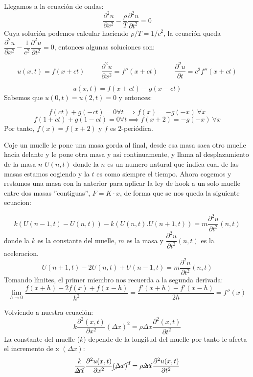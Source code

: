 \documentclass[openany]{book}
\begin{document}
Llegamos a la ecuación de ondas:
$$ \dfrac{\partial ^2 u}{\partial x ^2}- \dfrac{\rho}{T} \dfrac{\partial ^2 u}{\partial t ^2} = 0 $$
Cuya solución podemos calcular haciendo $ \rho/T = 1/c ^2 $, la ecuación queda $ \dfrac{\partial ^2 u}{\partial x ^2}-  \dfrac{1}{c ^2} \dfrac{\partial ^2 u}{\partial t ^2} = 0 $, entonces algunas soluciones son:

$$ u(x,t) = f(x+ct)\hspace{1cm}\dfrac{\partial ^2 u}{\partial x ^2} = f''(x+ct)\hspace{1cm} \dfrac{\partial ^2 u}{\partial t} = c ^2 f''(x+ct)  $$

$$ u(x,t) = f(x+ct)-g(x-ct) $$
Sabemos que $ u(0,t)=u(2,t)=0 $ y entonces:

$$ f(ct) +g(-ct) = 0 \forall t \implies f(x) = -g(-x) \ \forall x$$
$$ f(1+ct) +g(1-ct) = 0 \forall t \implies f(x+2)=-g(-x)\ \forall x $$
Por tanto, $ f(x) = f(x+2) $ y $ f $ es 2-periódica.


Coje un muelle le pone una masa gorda al final, desde esa masa saca otro muelle hacia delante y le pone otra masa y asi continuamente, y llama al desplazamiento de la masa $n$  $U(n,t)$ donde la $n$ es un numero natural que indica cual de las masas estamos cogiendo y la $t$ es como siempre el tiempo. Ahora cogemos y restamos una masa con la anterior para aplicar la ley de hook a un solo muelle entre dos masas ''contiguas'', $F=K \cdot x$, de forma que se nos queda la siguiente ecuacion:


$$ k(U(n-1,t)-U(n,t))-k(U(n,t).U(n+1,t)) = m \dfrac{\partial ^2 u}{\partial t ^2}(n,t)  $$
donde la $k$ es la constante del muelle, $m$ es la masa y $\dfrac{\partial ^2 u}{\partial t ^2}(n,t)$ es la aceleracion.
$$ U(n+1,t)-2U(n,t)+U(n-1,t) = m \dfrac{\partial ^2 u}{\partial t ^2}(n,t) $$
Tomando límites, el primer miembro nos recuerda a la segunda derivada:
$$ \lim_{h \to 0} \dfrac{f(x+h)-2f(x)+f(x-h)}{h ^2} = \dfrac{f'(x+h)-f'(x-h)}{2h}=f''(x)   $$

Volviendo a nuestra ecuación:
$$ k \dfrac{\partial ^2(x,t)}{\partial x ^2} (\Delta x)^2 = \rho \Delta x \dfrac{\partial ^2 (x,t)}{\partial t ^2}  $$
La constante del muelle ($k$) depende de la longitud del muelle por tanto le afecta el incremento de x $(\Delta x)$:
$$ \dfrac{k}{\cancel{\Delta x}}  \dfrac{\partial ^2u(x,t)}{\partial x ^2} \cancel{(\Delta x)^2} = \rho \cancel{\Delta x} \dfrac{\partial ^2 u(x,t)}{\partial t ^2}  $$
\end{document}
